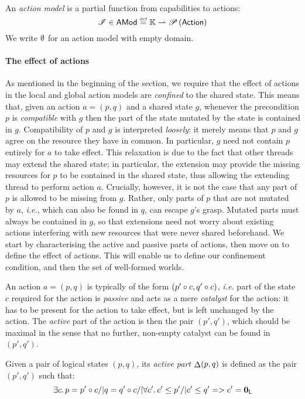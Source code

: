 \begin{definition}
An \emph{action model} is a partial function from capabilities to
actions:
\[
\mathscr{I} \in \textsf{AMod} \mathrel{\stackrel{\smash{\scriptscriptstyle{\mathrm{def}}}}{=}} \mathbb{K} \rightharpoonup \mathscr{P}\left(\mathsf{Action} \right)
\]
We write $\emptyset$ for an action model with empty domain.
\end{definition}


\paragraph{The effect of actions} As mentioned in the beginning of the
section, we require that the effect of actions in the local and global
action models are \emph{confined} to the shared state. This means
that, given an action $a = (p,q)$ and a shared state $g$, whenever the
precondition $p$ is \emph{compatible} with $g$ then the part of the
state mutated by the state is contained in $g$. Compatibility of $p$
and $g$ is interpreted \emph{loosely}: it merely means that $p$ and
$g$ agree on the resource they have in common. In particular, $g$ need
not contain $p$ entirely for $a$ to take effect. This relaxation is
due to the fact that other threads may extend the shared state; in
particular, the extension may provide the missing resources for $p$ to
be contained in the shared state, thus allowing the extending thread
to perform action $a$. Crucially, however, it is not the case that any
part of $p$ is allowed to be missing from $g$. Rather, only parts of
$p$ that are not mutated by $a$, \textit{i.e.}, which can also be
found in $q$, can escape $g$'s grasp. Mutated parts must always be
contained in $g$, so that extensions need not worry about existing
actions interfering with new resources that were never shared
beforehand. We start by characterising the active and passive parts of
actions, then move on to define the effect of actions. This will
enable us to define our confinement condition, and then the set of
well-formed worlds.

An action $a = (p, q)$ is typically of the form $(p'\circ c,
q'\circ c)$, \textit{i.e.} part of the state $c$ required for
the action is \emph{passive} and acts as a mere \emph{catalyst} for
the action: it has to be present for the action to take effect, but is
left unchanged by the action. The \emph{active} part of the action is then
the pair $(p',q')$, which should be maximal in the sense that no
further, non-empty catalyst can be found in $(p',q')$.

\begin{definition}
  Given a pair of logical states $(p, q)$, its \emph{active part}
  $\mathop{\Delta} (p,q)$ is defined as the pair $(p', q')$ such that:
  \[
  \exists c.\, p = p' \circ c /| q = q' \circ c /| \forall c'.\, c'\leq p' /|
  c'\leq q' => c' = \mathbf{0}_{\textsf{L}}
  \]
\end{definition}

